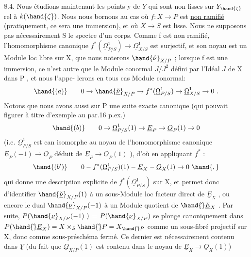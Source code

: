 
8.4. Nous étudions maintenant les points  y de $\underline{Y}$ qui sont non lisses
sur $Y_{\hand{\zeta}}$ rel à $k(\hand{\zeta})$. Nous nous  bornons au cas où  $f:X\to P$  est \uline{non ramifié}
(pratiquement, ce sera une immersion), et où $X\to S$ est lisse.  Nous ne
supposons pas nécessairement S le spectre d'un corps.  
 Comme
f  est non ramifié, l'homomorphisme canonique   $f^*(\underline{\Omega}^1_{P/S})\to\underline{\Omega}^1_{X/S}$
est surjectif, et son noyau est un Module loc libre sur X, que nous
noterons  $\hand{\check{\nu}}_{X/P}$ ; lorsque f est une immersion, ce n'est autre que le
Module \uline{conormal}  $\underline{J}/\underline{J}^2$  défini par l'Idéal $\underline{J}$ de X dans P , et nous l'appe-%
lerons en tous cas Module conormal:
\[ \hand{(a)} \qquad 0\to\hand{\check{\underline{\nu}}}_{X/P}\to f^*(\underline{\Omega}^1_{P/S})\to\underline{\Omega}^1_{X/S}\to 0 \ . \]
 Notons que nous avons aussi sur  P  une suite exacte canonique
(qui pouvait figurer à titre d'exemple au par.16 p.ex.)
\[ \hand{(b)} \qquad 0\to\underline{\Omega}^1_{P/S}(1)\to\underline{E}_P\to\underline{O}_P(1)\to 0 \]
(i.e. $\underline{\Omega}^1_{P/S}$ est can isomorphe au noyau de l'homomorphisme canonique
$\underline{E}_P(-1)\to\underline{O}_P$  déduit de $\underline{E}_P\to\underline{O}_P(1)$ ), d'où en appliquant $f^*$ :
\[ \hand{(b')} \qquad 0 - f^*(\underline{\Omega}^1_{P/S})(1) - \underline{E}_X - \underline{O}_X(1)\to 0 \ \hand{,} \]
qui donne une description explicite de  $f^*(\underline{\Omega}^1_{P/S})$   sur X, et
permet  donc d'identifier $\hand{\check{\underline{\nu}}}_{X/P}(1)$  à un sous-Module loc facteur direct
de $\underline{E}_X$ , ou encore le  dual  $\hand{\underline{\nu}}_{X/P}(-1)$  à un Module
quotient de $\hand{\check{}}\underline{E}_X$ .  Par suite,   $P(\hand{\underline{\nu}}_{X/P}(-1)\ )$  =  $P(\hand{\underline{\nu}}_{X/P})$  se plonge
canoniquement dans  $P(\hand{\check{}}\underline{E}_X) = X\times_S\hand{\check{}}P = X_{\hand{\check{}}P}$ comme un sous-fibré projectif sur
X, donc comme sous-préschéma fermé. Ce dernier est nécessairement contenu
dans $\underline{Y}$  (du fait que $\underline{\Omega}_{X/P}(1)$  est contenu dans le noyau de  $\underline{E}_X\to\underline{O}_X(1)$)





